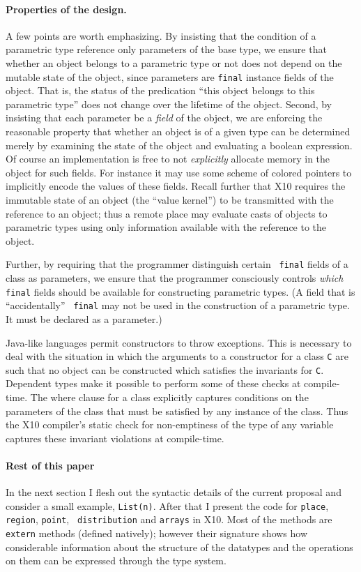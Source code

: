 \documentclass{article}
\def\Xten{{\sf X10}}
\def\java{{\sf Java}}
\begin{document}
\paragraph{Properties of the design.}
A few points are worth emphasizing.  By insisting that the condition
of a parametric type reference only parameters of the base type, we
ensure that whether an object belongs to a parametric type or not does
not depend on the mutable state of the object, since parameters are
{\tt final} instance fields of the object. That is, the status of the
predication ``this object belongs to this parametric type'' does not
change over the lifetime of the object. Second, by insisting that each
parameter be a {\em field} of the object, we are enforcing the
reasonable property that whether an object is of a given type can be
determined merely by examining the state of the object and evaluating
a boolean expression. Of course an implementation is free to not {\em
explicitly} allocate memory in the object for such fields. For
instance it may use some scheme of colored pointers to implicitly
encode the values of these fields. Recall further that \Xten{}
requires the immutable state of an object (the ``value kernel'') to be
transmitted with the reference to an object; thus a remote place may
evaluate casts of objects to parametric types using only information
available with the reference to the object.

Further, by requiring that the programmer distinguish certain {\tt
final} fields of a class as parameters, we ensure that the programmer
consciously controls {\em which} {\tt final} fields should be available for
constructing parametric types. (A field that is ``accidentally'' {\tt
final} may not be used in the construction of a parametric type. It must be
declared as a parameter.)

\java{}-like languages permit constructors to throw exceptions. This
is necessary to deal with the situation in which the arguments to a
constructor for a class {\tt C} are such that no object can be
constructed which satisfies the invariants for {\tt C}. Dependent
types make it possible to perform some of these checks at
compile-time. The where clause for a class explicitly captures
conditions on the parameters of the class that must be satisfied by
any instance of the class. Thus the \Xten{} compiler's static check for
non-emptiness of the type of any variable captures these invariant
violations at compile-time.

\paragraph{Rest of this paper}
In the next section I flesh out the syntactic details of the current
proposal and consider a small example, {\tt List(n)}. After that I
present the code for {\tt place}, {\tt region}, {\tt point}, {\tt
distribution} and {\tt arrays} in \Xten. Most of the methods are {\tt
extern} methods (defined natively); however their signature shows how
considerable information about the structure of the datatypes and the
operations on them can be expressed through the type system.
\end{document}
